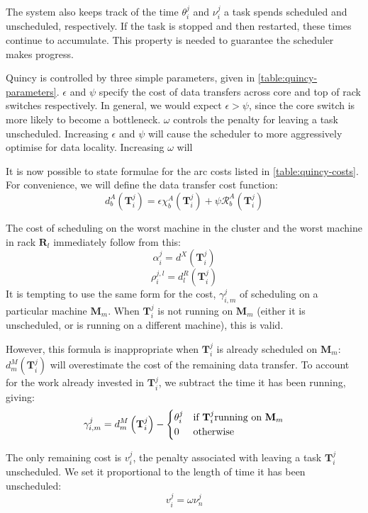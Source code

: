 The system also keeps track of the time $\theta_i^j$ and $\nu_i^j$ a task spends scheduled and unscheduled, respectively. If the task is stopped and then restarted, these times continue to accumulate. This property is needed to guarantee the scheduler makes progress.

Quincy is controlled by three simple parameters, given in \cref{table:quincy-parameters}. $\epsilon$ and $\psi$ specify the cost of data transfers across core and top of rack switches respectively. In general, we would expect $\epsilon > \psi$, since the core switch is more likely to become a bottleneck. $\omega$ controls the penalty for leaving a task unscheduled\footnotemark. Increasing $\epsilon$ and $\psi$ will cause the scheduler to more aggressively optimise for data locality. Increasing $\omega$ will 

It is now possible to state formulae for the arc costs listed in \cref{table:quincy-costs}. For convenience, we will define the data transfer cost function:
\[d_{b}^{A}\left(\mathbf{T}_{i}^{j}\right) = \epsilon\chi_{b}^{A}\left(\mathbf{T}_{i}^{j}\right)+\psi\mathcal{R}_{b}^{A}\left(\mathbf{T}_{i}^{j}\right)\]

The cost of scheduling on the worst machine in the cluster and the worst machine in rack $\mathbf{R}_l$ immediately follow from this:
\[\alpha_{i}^{j} = d^X\left(\mathbf{T}_{i}^{j}\right)\]
\[\rho_{i}^{j,l} = d^R_l\left(\mathbf{T}_{i}^{j}\right)\]
It is tempting to use the same form for the cost, $\gamma^j_{i,m}$ of scheduling on a particular machine $\mathbf{M}_m$. When $\mathbf{T}_{i}^{j}$ is not running on $\mathbf{M}_m$ (either it is unscheduled, or is running on a different machine), this is valid. 

However, this formula is inappropriate when $\mathbf{T}_{i}^{j}$ is already scheduled on  $\mathbf{M}_m$: $d^M_m\left(\mathbf{T}_{i}^{j}\right)$ will overestimate the cost of the remaining data transfer. To account for the work already invested in $\mathbf{T}_{i}^{j}$, we subtract the time it has been running, giving:
\[\gamma_{i,m}^{j} = d_{m}^{M}\left(\mathbf{T}_{i}^{j}\right)-\begin{cases}
\theta_{i}^{j} & \text{if \ensuremath{\mathbf{T}_{i}^{j}}running on \ensuremath{\mathbf{M}_{m}}}\\
0 & \text{otherwise}
\end{cases}\]

The only remaining cost is $v_i^j$, the penalty associated with leaving a task $\mathbf{T}_{i}^{j}$ unscheduled. We set it proportional to the length of time it has been unscheduled:
\[v_i^j = \omega\nu_{n}^{j}\]

